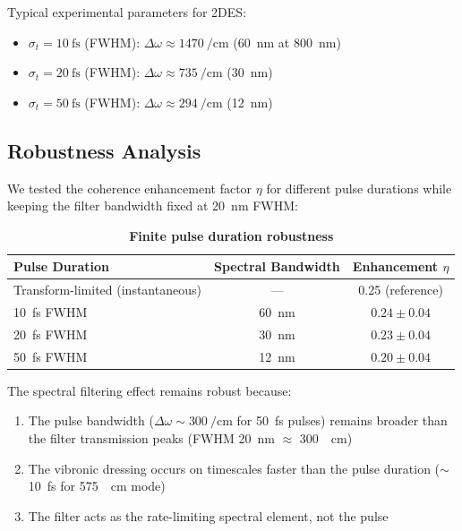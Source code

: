 \documentclass[11pt,a4paper]{article}
\begin{document}
Typical experimental parameters for 2DES:
\begin{itemize}
    \item $\sigma_t = \SI{10}{\femto\second}$ (FWHM): $\Delta\omega \approx \SI{1470}{\per\centi\meter}$ (\SI{60}{\nano\meter} at \SI{800}{\nano\meter})
    \item $\sigma_t = \SI{20}{\femto\second}$ (FWHM): $\Delta\omega \approx \SI{735}{\per\centi\meter}$ (\SI{30}{\nano\meter})
    \item $\sigma_t = \SI{50}{\femto\second}$ (FWHM): $\Delta\omega \approx \SI{294}{\per\centi\meter}$ (\SI{12}{\nano\meter})
\end{itemize}

\subsection{Robustness Analysis}

We tested the coherence enhancement factor $\eta$ for different pulse durations while keeping the filter bandwidth fixed at \SI{20}{\nano\meter} FWHM:

\begin{table}[h]
\centering
\caption{\textbf{Finite pulse duration robustness}}
\label{tab:SI_pulse_duration}
\begin{tabular}{lcc}
\toprule
\textbf{Pulse Duration} & \textbf{Spectral Bandwidth} & \textbf{Enhancement $\eta$} \\
\midrule
Transform-limited (instantaneous) & --- & 0.25 (reference) \\
\SI{10}{\femto\second} FWHM & \SI{60}{\nano\meter} & $0.24 \pm 0.04$ \\
\SI{20}{\femto\second} FWHM & \SI{30}{\nano\meter} & $0.23 \pm 0.04$ \\
\SI{50}{\femto\second} FWHM & \SI{12}{\nano\meter} & $0.20 \pm 0.04$ \\
\bottomrule
\end{tabular}
\end{table}

The spectral filtering effect remains robust because:
\begin{enumerate}
    \item The pulse bandwidth ($\Delta\omega \sim \SI{300}{\per\centi\meter}$ for \SI{50}{\femto\second} pulses) remains broader than the filter transmission peaks (FWHM \SI{20}{\nano\meter} $\approx$ \SI{300}{\per\centi\meter})
    \item The vibronic dressing occurs on timescales faster than the pulse duration ($\sim$\SI{10}{\femto\second} for \SI{575}{\per\centi\meter} mode)
    \item The filter acts as the rate-limiting spectral element, not the pulse
\end{enumerate}
\end{document}
